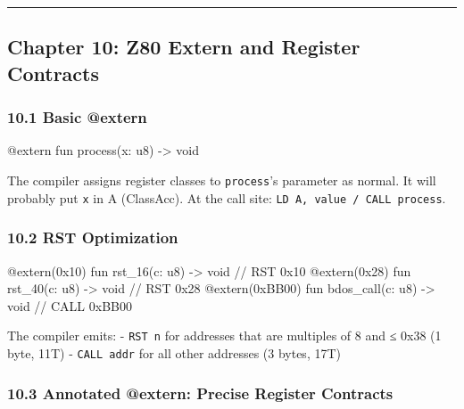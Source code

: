 \documentclass[
  11pt,
]{article}
\newenvironment{Shaded}{}{}
\newcommand{\NormalTok}[1]{#1}
\begin{document}
\begin{center}\rule{0.5\linewidth}{0.5pt}\end{center}

\subsection{Chapter 10: Z80 Extern and Register
Contracts}\label{chapter-10-z80-extern-and-register-contracts}

\subsubsection{10.1 Basic @extern}\label{basic-extern}

\begin{Shaded}
\begin{Highlighting}[]
\NormalTok{@extern fun process(x: u8) {-}\textgreater{} void}
\end{Highlighting}
\end{Shaded}

The compiler assigns register classes to \texttt{process}'s parameter as
normal. It will probably put \texttt{x} in A (ClassAcc). At the call
site: \texttt{LD\ A,\ value\ /\ CALL\ process}.

\subsubsection{10.2 RST Optimization}\label{rst-optimization}

\begin{Shaded}
\begin{Highlighting}[]
\NormalTok{@extern(0x10) fun rst\_16(c: u8) {-}\textgreater{} void   // RST 0x10}
\NormalTok{@extern(0x28) fun rst\_40(c: u8) {-}\textgreater{} void   // RST 0x28}
\NormalTok{@extern(0xBB00) fun bdos\_call(c: u8) {-}\textgreater{} void  // CALL 0xBB00}
\end{Highlighting}
\end{Shaded}

The compiler emits: - \texttt{RST\ n} for addresses that are multiples
of 8 and ≤ 0x38 (1 byte, 11T) - \texttt{CALL\ addr} for all other
addresses (3 bytes, 17T)

\subsubsection{10.3 Annotated @extern: Precise Register
Contracts}\label{annotated-extern-precise-register-contracts}
\end{document}
